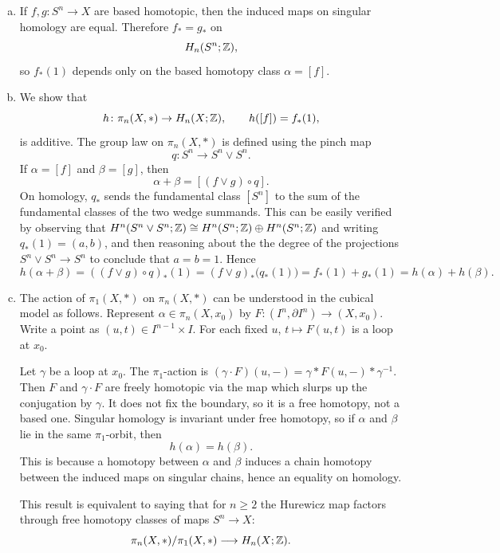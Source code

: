 \documentclass[12pt]{article}
\begin{document}
\begin{solution}
\begin{enumerate}[(a)]
    \item If $f,g\colon S^n\to X$ are based homotopic, then the induced maps on singular homology are equal. Therefore $f_*=g_*$ on
    \[
    H_n(S^n;\mathbb{Z}),
    \]
    so $f_*(1)$ depends only on the based homotopy class $\alpha=[f]$.

    \item We show that
    \[
    h\colon \pi_n(X,*)\to H_n(X;\mathbb{Z}),
    \qquad
    h([f])=f_*(1),
    \]
    is additive. The group law on $\pi_n(X,*)$ is defined using the pinch map
    \[
    q\colon S^n\to S^n\vee S^n.
    \]
    If $\alpha=[f]$ and $\beta=[g]$, then
    \[
    \alpha+\beta=[(f\vee g)\circ q].
    \]
    On homology, $q_*$ sends the fundamental class $[S^n]$ to the sum of the fundamental classes of the two wedge summands. This can be easily verified by observing that $H^n(S^n\vee S^n;\mathbb{Z}) \cong H^n(S^n;\mathbb{Z}) \oplus H^n(S^n;\mathbb{Z})$ and writing $q_*(1) = (a,b)$, and then reasoning about the the degree of the projections $S^n\vee S^n \to S^n$ to conclude that $a=b=1$. Hence
    \[
    h(\alpha+\beta)
    =((f\vee g)\circ q)_*(1)
    =(f\vee g)_*\bigl(q_*(1)\bigr)
    =f_*(1)+g_*(1)
    =h(\alpha)+h(\beta).
    \]

    \item The action of $\pi_1(X,*)$ on $\pi_n(X,*)$ can be understood in the cubical model as follows. Represent
    $\alpha\in\pi_n(X,x_0)$
    by
    $F:(I^n,\partial I^n)\to (X,x_0)$.
    Write a point as $(u,t)\in I^{n-1}\times I$. For each fixed $u$,
    $t\mapsto F(u,t)$
    is a loop at $x_0$.

    Let $\gamma$ be a loop at $x_0$. The $\pi_1$-action is
    $(\gamma\cdot F)(u,-)=\gamma * F(u,-) * \gamma^{-1}$. Then $F$ and $\gamma\cdot F$ are freely homotopic via the map which slurps up the conjugation by $\gamma$. It does not fix the boundary, so it is a free homotopy, not a based one. Singular homology is invariant under free homotopy, so if $\alpha$ and $\beta$ lie in the same $\pi_1$-orbit, then
    \[
    h(\alpha)=h(\beta).
    \] This is because a homotopy between $\alpha$ and $\beta$ induces a chain homotopy between the induced maps on singular chains, hence an equality on homology.
    
    This result is equivalent to saying that for $n\ge 2$ the Hurewicz map factors through free homotopy classes of maps $S^n\to X$:
    \[
    \pi_n(X,*)/\pi_1(X,*)\longrightarrow H_n(X;\mathbb{Z}).
    \]
\end{enumerate}
\end{solution}
\end{document}
